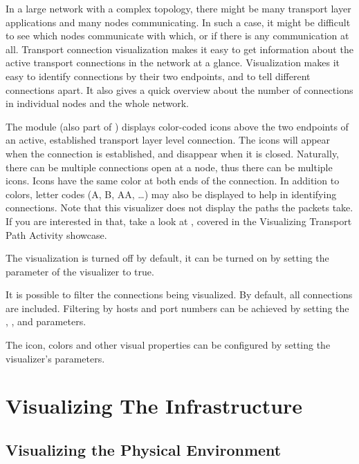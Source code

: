 In a large network with a complex topology, there might be many transport layer
applications and many nodes communicating. In such a case, it might be difficult
to see which nodes communicate with which, or if there is any communication at
all. Transport connection visualization makes it easy to get information about
the active transport connections in the network at a glance. Visualization makes
it easy to identify connections by their two endpoints, and to tell different
connections apart. It also gives a quick overview about the number of
connections in individual nodes and the whole network.

The  module (also part of )
displays color-coded icons above the two endpoints of an active, established
transport layer level connection. The icons will appear when the connection is
established, and disappear when it is closed. Naturally, there can be multiple
connections open at a node, thus there can be multiple icons. Icons have the
same color at both ends of the connection. In addition to colors, letter codes
(A, B, AA, …) may also be displayed to help in identifying connections. Note
that this visualizer does not display the paths the packets take. If you are
interested in that, take a look at , covered in the
Visualizing Transport Path Activity showcase.

The visualization is turned off by default, it can be turned on by setting the
 parameter of the visualizer to true.

It is possible to filter the connections being visualized. By default, all
connections are included. Filtering by hosts and port numbers can be achieved by
setting the , ,
 and  parameters.

The icon, colors and other visual properties can be configured by setting the
visualizer's parameters.


\section{Visualizing The Infrastructure}

\subsection{Visualizing the Physical Environment}

